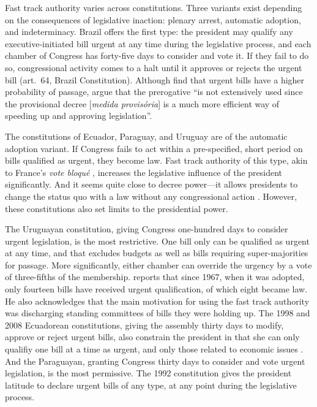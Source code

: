 Fast track authority varies across constitutions. Three variants exist depending on the consequences of legislative inaction: plenary arrest, automatic adoption, and indeterminacy. Brazil offers the first type: the president may qualify any executive-initiated bill urgent at any time during the legislative process, and each chamber of Congress has forty-five days to consider and vote it. If they fail to do so, congressional activity comes to a halt until it approves or rejects the urgent bill (art.~64, Brazil Constitution). Although \citet{hiroi-renno-2016} find that urgent bills have a higher probability of passage, \citet[][:164]{figueiredo.limongi.2000} argue that the prerogative ``is not extensively used since the provisional decree [\emph{medida provis\'oria}] is a much more efficient way of speeding up and approving legislation''.

The constitutions of Ecuador, Paraguay, and Uruguay are of the automatic adoption variant. If Congress fails to act within a pre-specified, short period on bills qualified as urgent, they become law. Fast track authority of this type, akin to France's \emph{vote bloqué} \citep{huber.1996b}, increases the legislative influence of the president significantly. And it seems quite close to decree power---it allows presidents to change the status quo with a law without any congressional action \citep{carey.shugart.1998}. However, these constitutions also set limits to the presidential power. 

The Uruguayan constitution, giving Congress one-hundred days to consider urgent legislation, is the most restrictive. One bill only can be qualified as urgent at any time, and that excludes budgets as well as bills requiring super-majorities for passage. More significantly, either chamber can override the urgency by a vote of three-fifths of the membership. \citet{chasquetti.2016} reports that since 1967, when it was adopted, only fourteen bills have received urgent qualification, of which eight became law. He also acknowledges that the main motivation for using the fast track authority was discharging standing committees of bills they were holding up. The 1998 and 2008 Ecuadorean constitutions, giving the assembly thirty days to modify, approve or reject urgent bills, also constrain the president in that she can only qualifiy one bill at a time as urgent, and only those related to economic issues \citep{morgenstern-polga-shair.2013}. And the Paraguayan, granting Congress thirty days to consider and vote urgent legislation, is the most permissive. The 1992 constitution gives the president latitude to declare urgent bills of any type, at any point during the legislative process.

